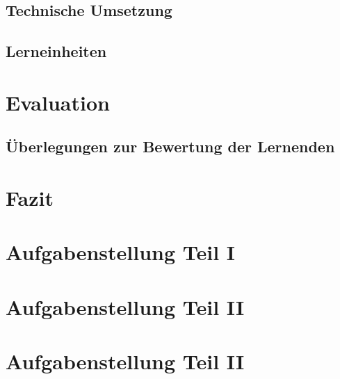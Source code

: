 \documentclass[a4paper, 12pt]{article}
\begin{document}
    \subsection{Technische Umsetzung}
    
    \subsection{Lerneinheiten}
    \label{sec:learning-unit}
    
    \pagebreak

    \section{Evaluation}
    
    \subsection{Überlegungen zur Bewertung der Lernenden}
    
    \pagebreak


    \section{Fazit}
    
    \pagebreak

    
    \pagebreak

    \appendix
    \section{Aufgabenstellung Teil I}
    

    \section{Aufgabenstellung Teil II}
    

    \section{Aufgabenstellung Teil II}
    
\end{document}
